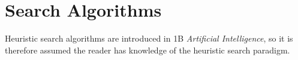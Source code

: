 \documentclass[12pt,a4paper,twoside,openany]{report} \usepackage[pdfborder={0 0 0}]{hyperref}    %
\DeclareMathOperator*{\argmax}{arg\,max} \DeclareMathOperator*{\argmin}{arg\,min}
\theoremstyle{definition} \newtheorem{definition}{Definition}[section]
\begin{document}
%
%
%
\FloatBarrier 
\section{Search Algorithms}
\label{sec:searchAlgos}

Heuristic search algorithms are introduced in 1B \textit{Artificial Intelligence}, so it is therefore assumed the reader
has knowledge of the heuristic search paradigm.
\end{document}
